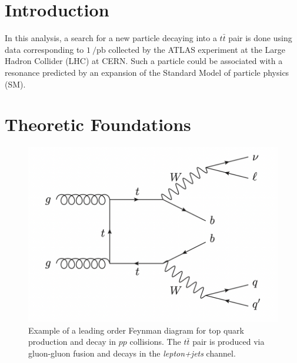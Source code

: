 \section{Introduction}
In this analysis, a search for a new particle decaying into a $t\bar{t}$ pair is done using data corresponding to $\SI{1}{\per\pico\barn}$ collected by the ATLAS experiment at the Large Hadron Collider (LHC) at CERN. Such a particle could be associated with a resonance predicted by an expansion of the Standard Model of particle physics (SM).

\section{Theoretic Foundations}

\begin{figure}[tb]
  \centering
  \includegraphics[width=.8\textwidth]{graphics/top_decay.png}
  \caption{Example of a leading order Feynman diagram for top quark production and decay in $pp$ collisions. The $t\bar{t}$ pair is produced via gluon-gluon fusion and decays in the \textit{lepton+jets} channel.~\cite{anleitung}}
  \label{fig:decay}
\end{figure}

